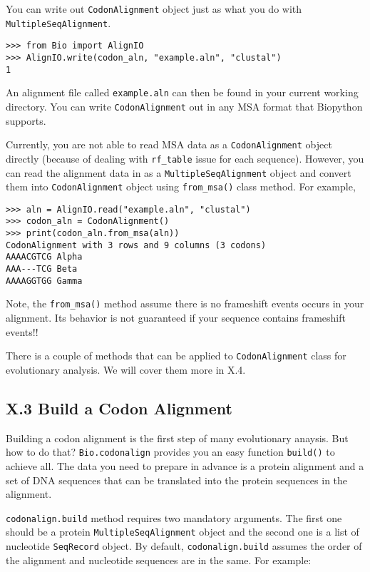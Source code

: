 \documentclass{article}
\begin{document}
You can write out \texttt{CodonAlignment} object just as what you do
with \texttt{MultipleSeqAlignment}.

\begin{verbatim}
>>> from Bio import AlignIO
>>> AlignIO.write(codon_aln, "example.aln", "clustal")
1
\end{verbatim}

An alignment file called \texttt{example.aln} can then be found in your
current working directory. You can write \texttt{CodonAlignment} out in
any MSA format that Biopython supports.

Currently, you are not able to read MSA data as a
\texttt{CodonAlignment} object directly (because of dealing with
\texttt{rf\_table} issue for each sequence). However, you can read the
alignment data in as a \texttt{MultipleSeqAlignment} object and convert
them into \texttt{CodonAlignment} object using \texttt{from\_msa()}
class method. For example,

\begin{verbatim}
>>> aln = AlignIO.read("example.aln", "clustal")
>>> codon_aln = CodonAlignment()
>>> print(codon_aln.from_msa(aln))
CodonAlignment with 3 rows and 9 columns (3 codons)
AAAACGTCG Alpha
AAA---TCG Beta
AAAAGGTGG Gamma
\end{verbatim}

Note, the \texttt{from\_msa()} method assume there is no frameshift
events occurs in your alignment. Its behavior is not guaranteed if your
sequence contains frameshift events!!

There is a couple of methods that can be applied to
\texttt{CodonAlignment} class for evolutionary analysis. We will cover
them more in X.4.

\subsection{X.3 Build a Codon Alignment}

Building a codon alignment is the first step of many evolutionary
anaysis. But how to do that? \texttt{Bio.codonalign} provides you an
easy function \texttt{build()} to achieve all. The data you need to
prepare in advance is a protein alignment and a set of DNA sequences
that can be translated into the protein sequences in the alignment.

\texttt{codonalign.build} method requires two mandatory arguments. The
first one should be a protein \texttt{MultipleSeqAlignment} object and
the second one is a list of nucleotide \texttt{SeqRecord} object. By
default, \texttt{codonalign.build} assumes the order of the alignment
and nucleotide sequences are in the same. For example:
\end{document}
